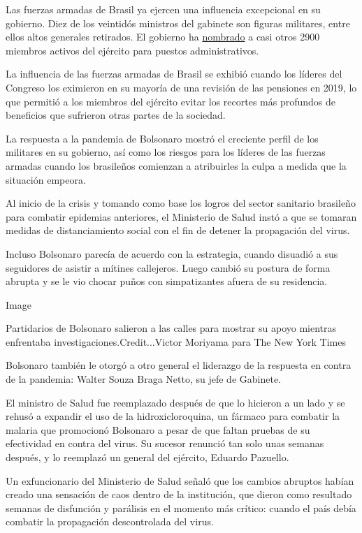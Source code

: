 Las fuerzas armadas de Brasil ya ejercen una influencia excepcional en
su gobierno. Diez de los veintidós ministros del gabinete son figuras
militares, entre ellos altos generales retirados. El gobierno ha
\href{https://www.poder360.com.br/analise/os-2-897-militares-no-governo-e-a-falta-de-quadros-entre-os-aliados/}{nombrado}
a casi otros 2900 miembros activos del ejército para puestos
administrativos.

La influencia de las fuerzas armadas de Brasil se exhibió cuando los
líderes del Congreso los eximieron en su mayoría de una revisión de las
pensiones en 2019, lo que permitió a los miembros del ejército evitar
los recortes más profundos de beneficios que sufrieron otras partes de
la sociedad.

La respuesta a la pandemia de Bolsonaro mostró el creciente perfil de
los militares en su gobierno, así como los riesgos para los líderes de
las fuerzas armadas cuando los brasileños comienzan a atribuirles la
culpa a medida que la situación empeora.

Al inicio de la crisis y tomando como base los logros del sector
sanitario brasileño para combatir epidemias anteriores, el Ministerio de
Salud instó a que se tomaran medidas de distanciamiento social con el
fin de detener la propagación del virus.

Incluso Bolsonaro parecía de acuerdo con la estrategia, cuando disuadió
a sus seguidores de asistir a mítines callejeros. Luego cambió su
postura de forma abrupta y se le vio chocar puños con simpatizantes
afuera de su residencia.

Image

Partidarios de Bolsonaro salieron a las calles para mostrar su apoyo
mientras enfrentaba investigaciones.Credit...Victor Moriyama para The
New York Times

Bolsonaro también le otorgó a otro general el liderazgo de la respuesta
en contra de la pandemia: Walter Souza Braga Netto, su jefe de Gabinete.

El ministro de Salud fue reemplazado después de que lo hicieron a un
lado y se rehusó a expandir el uso de la hidroxicloroquina, un fármaco
para combatir la malaria que promocionó Bolsonaro a pesar de que faltan
pruebas de su efectividad en contra del virus. Su sucesor renunció tan
solo unas semanas después, y lo reemplazó un general del ejército,
Eduardo Pazuello.

Un exfuncionario del Ministerio de Salud señaló que los cambios abruptos
habían creado una sensación de caos dentro de la institución, que dieron
como resultado semanas de disfunción y parálisis en el momento más
crítico: cuando el país debía combatir la propagación descontrolada del
virus.

